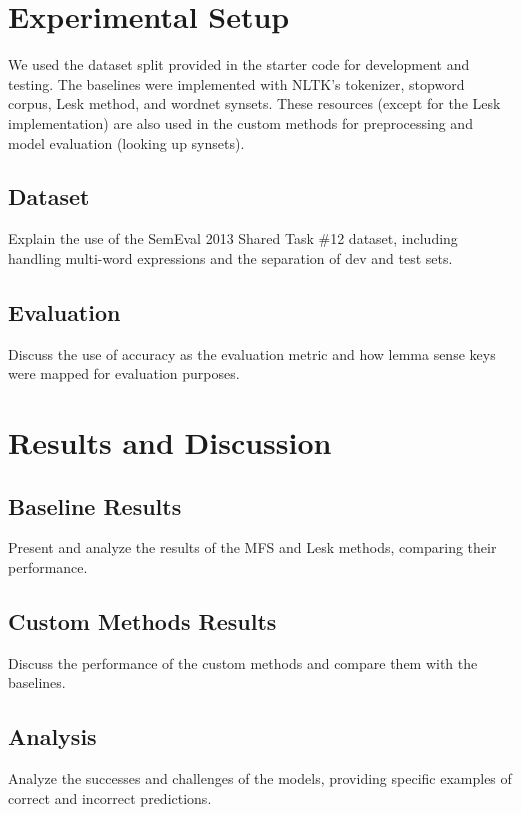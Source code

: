 \documentclass[11pt]{article}
\begin{document}

\section{Experimental Setup}
We used the dataset split provided in the starter code for development and testing. The
baselines were implemented with NLTK's tokenizer, stopword corpus, Lesk method, and wordnet synsets. 
These resources (except for the Lesk implementation) are also used in the custom methods for preprocessing
and model evaluation (looking up synsets).
\subsection{Dataset}
Explain the use of the SemEval 2013 Shared Task \#12 dataset, including handling multi-word expressions and the separation of dev and test sets.

\subsection{Evaluation}
Discuss the use of accuracy as the evaluation metric and how lemma sense keys were mapped for evaluation purposes.

\section{Results and Discussion}
\subsection{Baseline Results}
Present and analyze the results of the MFS and Lesk methods, comparing their performance.

\subsection{Custom Methods Results}
Discuss the performance of the custom methods and compare them with the baselines.

\subsection{Analysis}
Analyze the successes and challenges of the models, providing specific examples of correct and incorrect predictions.
\end{document}
